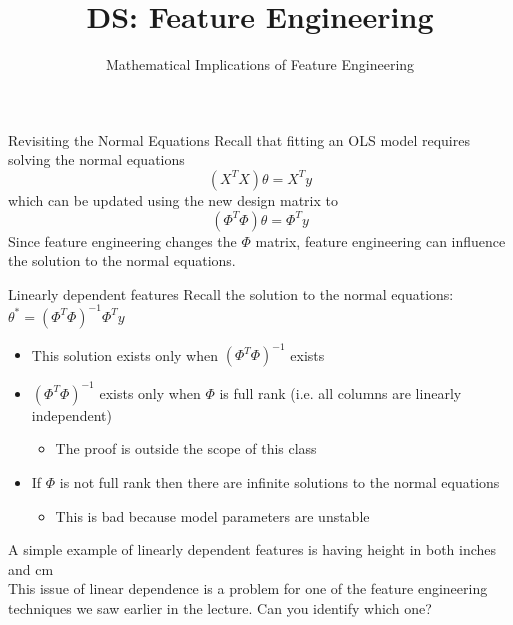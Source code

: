 \documentclass[aspectratio=169]{../latex_main/tntbeamer}  %
\title[Introduction]{DS: Feature Engineering}
\subtitle{Mathematical Implications of Feature Engineering}
\begin{document}
	
	\maketitle
	\begin{frame}[c]{Revisiting the Normal Equations}
	    Recall that fitting an OLS model requires solving the normal equations
        \begin{equation*}
            (X^TX)\theta = X^Ty
        \end{equation*}
        which can be updated using the new design matrix to
        \begin{equation*}
            (\Phi^T\Phi)\theta = \Phi^Ty
        \end{equation*}
        Since feature engineering changes the $\Phi$ matrix, feature engineering can influence the solution to the normal equations.
	\end{frame}
	
	
	\begin{frame}[c]{Linearly dependent features}
	    Recall the solution to the normal equations: $\theta^* = (\Phi^T\Phi)^{-1}\Phi^Ty$
        \begin{itemize}
            \item This solution exists only when $(\Phi^T\Phi)^{-1}$ exists
            \item $(\Phi^T\Phi)^{-1}$  exists only when $\Phi$ is full rank (i.e. all columns are linearly independent)
            \begin{itemize}
                \item The proof is outside the scope of this class
            \end{itemize}
            \item If $\Phi$ is not full rank then there are infinite solutions to the normal equations
            \begin{itemize}
                \item This is bad because model parameters are unstable
            \end{itemize}
        \end{itemize}
        A simple example of linearly dependent features is having height in both inches and cm\\
        \bigskip
        This issue of linear dependence is a problem for one of the feature engineering techniques we saw earlier in the lecture. Can you identify which one?
	\end{frame}
	
\end{document}
